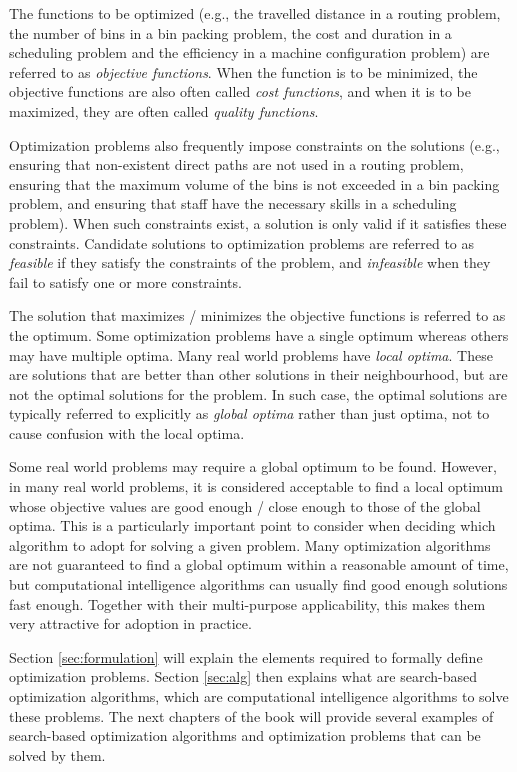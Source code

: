 The functions to be optimized (e.g., the travelled distance in a routing problem, the number of bins in a bin packing problem, the cost and duration in a scheduling problem and the efficiency in a machine configuration problem) are referred to as \textit{objective functions}. When the function is to be minimized, the objective functions are also often called \textit{cost functions}, and when it is to be maximized, they are often called \textit{quality functions}.

Optimization problems also frequently impose constraints on the solutions (e.g., ensuring that non-existent direct paths are not used in a routing problem, ensuring that the maximum volume of the bins is not exceeded in a bin packing problem, and ensuring that staff have the necessary skills in a scheduling problem). When such constraints exist, a solution is only valid if it satisfies these constraints. Candidate solutions to optimization problems are referred to as \textit{feasible} if they satisfy the constraints of the problem, and \textit{infeasible} when they fail to satisfy one or more constraints. 

The solution that maximizes / minimizes the objective functions is referred to as the optimum. Some optimization problems have a single optimum whereas others may have multiple optima. Many real world problems have \textit{local optima}. These are solutions that are better than other solutions in their neighbourhood, but are not the optimal solutions for the problem. In such case, the optimal solutions are typically referred to explicitly as \textit{global optima} rather than just optima, not to cause confusion with the local optima. 

Some real world problems may require a global optimum to be found. However, in many real world problems, it is considered acceptable to find a local optimum whose objective values are good enough / close enough to those of the global optima. This is a particularly important point to consider when deciding which algorithm to adopt for solving a given problem. Many optimization algorithms are not guaranteed to find a global optimum within a reasonable amount of time, but computational intelligence algorithms can usually find good enough solutions fast enough. Together with their multi-purpose applicability, this makes them very attractive for adoption in practice. 

Section \ref{sec:formulation} will explain the elements required to formally define optimization problems. Section \ref{sec:alg} then explains what are search-based optimization algorithms, which are computational intelligence algorithms to solve these problems. The next chapters of the book will provide several examples of search-based optimization algorithms and optimization problems that can be solved by them.



